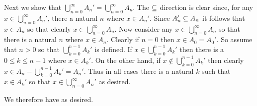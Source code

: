 {{    Next we show that $\bigcup_{n=0}^\infty A_n' = \bigcup_{n=0}^\infty A_n$.
    The $\ss$ direction is clear since, for any $x \in \bigcup_{n=0}^\infty A_n'$, there a natural $n$ where $x \in A_n'$.
    Since $A_n' \ss A_n$ it follows that $x \in A_n$ so that clearly $x \in \bigcup_{n=0}^\infty A_n$.
    Now consider any $x \in \bigcup_{n=0}^\infty A_n$ so that there is a natural $n$ where $x \in A_n$.
    Clearly if $n=0$ then $x \in A_0 = A_0'$.
    So assume that $n > 0$ so that $\bigcup_{k=0}^{n-1} A_k'$ is defined.
    If $x \in \bigcup_{k=0}^{n-1} A_k'$ then there is a $0 \leq k \leq n-1$ where $x \in A_k'$.
    On the other hand, if $x \notin \bigcup_{k=0}^{n-1} A_k'$ then clearly $x \in A_n - \bigcup_{k=0}^{n-1} A_k' = A_n'$.
    Thus in all cases there is a natural $k$ such that $x \in A_k'$ so that $x \in \bigcup_{n=0}^\infty A_n'$ as desired.

    We therefore have
    as desired.
  }
}

